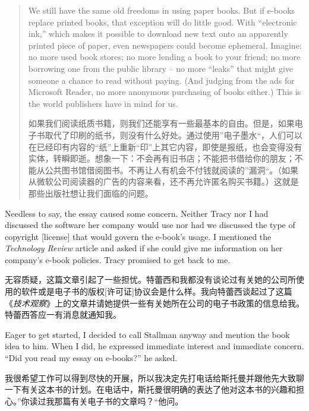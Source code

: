 \begin{quote}
\ifdefined\eng
We still have the same old freedoms in using paper books. But if e-books replace printed books, that exception will do little good. With ``electronic ink,'' which makes it possible to download new text onto an apparently printed piece of paper, even newspapers could become ephemeral. Imagine: no more used book stores; no more lending a book to your friend; no more borrowing one from the public library -- no more ``leaks'' that might give someone a chance to read without paying. (And judging from the ads for Microsoft Reader, no more anonymous purchasing of books either.) This is the world publishers have in mind for us.
\fi

\ifdefined\chs
如果我们阅读纸质书籍，则我们还能享有一些最基本的自由。但是，如果电子书取代了印刷的纸书，则没有什么好处。通过使用”电子墨水“，人们可以在已经印有内容的“纸”上重新“印”上其它内容，即使是报纸，也会变得没有实体，转瞬即逝。想象一下：不会再有旧书店；不能把书借给你的朋友；不能从公共图书馆借阅图书。不再让人有机会不付钱就阅读的”漏洞“。（如果从微软公司阅读器的广告的内容来看，还不再允许匿名购买书籍。）这就是那些出版社想让我们面临的问题。
\fi
\end{quote}

\ifdefined\eng
Needless to say, the essay caused some concern. Neither Tracy nor I had discussed the software her company would use nor had we discussed the type of copyright [license] that would govern the e-book's usage. I mentioned the \textit{Technology Review} article and asked if she could give me information on her company's e-book policies. Tracy promised to get back to me.
\fi

\ifdefined\chs
无容质疑，这篇文章引起了一些担忧。特蕾西和我都没有谈论过有关她的公司所使用的软件或是电子书的版权[许可证]协议会是什么样。我向特蕾西谈起过了这篇《\textit{技术观察}》上的文章并请她提供一些有关她所在公司的电子书政策的信息给我。特蕾西答应一有消息就通知我。
\fi

\ifdefined\eng
Eager to get started, I decided to call Stallman anyway and mention the book idea to him. When I did, he expressed immediate interest and immediate concern. ``Did you read my essay on e-books?'' he asked.
\fi

\ifdefined\chs
我很希望工作可以得到尽快的开展，所以我决定先打电话给斯托曼并跟他先大致聊一下有关这本书的计划。在电话中，斯托曼很明确的表达了他对这本书的兴趣和担心。”你读过我那篇有关电子书的文章吗？“他问。
\fi

